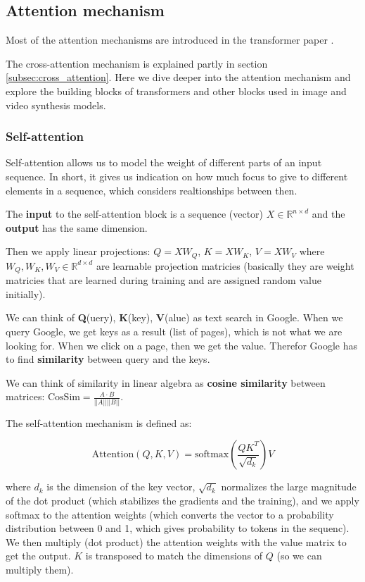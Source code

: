 \subsection{Attention mechanism}
\label{appendix:attention}

Most of the attention mechanisms are introduced in the transformer paper \cite{transformer}.

The cross-attention mechanism is explained partly in section \ref{subsec:cross_attention}. Here we dive deeper into the attention mechanism and explore the building blocks of transformers and other blocks used in image and video synthesis models.


\subsubsection{Self-attention}

Self-attention allows us to model the weight of different parts of an input sequence. In short, it gives us indication on how much focus to give to different elements in a sequence, which considers realtionships between then.

The \textbf{input} to the self-attention block is a sequence (vector) $X \in \mathbb{R}^{n \times d}$ and the \textbf{output} has the same dimension.

Then we apply linear projections: $Q = XW_Q$, $K = XW_K$, $V = XW_V$ where $W_Q, W_K, W_V \in \mathbb{R}^{d \times d}$ are learnable projection matricies (basically they are weight matricies that are learned during training and are assigned random value initially).

We can think of \textbf{Q}(uery), \textbf{K}(key), \textbf{V}(alue) as text search in Google. When we query Google, we get keys as a result (list of pages), which is not what we are looking for. When we click on a page, then we get the value. Therefor Google has to find \textbf{similarity} between query and the keys.

We can think of similarity in linear algebra as \textbf{cosine similarity} between matrices: $\text{CosSim} = \frac{A \cdot B}{||A|| ||B||}$.

The self-attention mechanism is defined as:

\begin{equation*}
    \text{Attention}(Q, K, V) = \text{softmax}\left( \frac{QK^T}{\sqrt{d_k}} \right) V
\end{equation*}

where $d_k$ is the dimension of the key vector, $\sqrt{d_k}$ normalizes the large magnitude of the dot product (which stabilizes the gradients and the training), and we apply softmax to the attention weights (which converts the vector to a probability distribution between 0 and 1, which gives probability to tokens in the sequenc). We then multiply (dot product) the attention weights with the value matrix to get the output. $K$ is transposed to match the dimensions of $Q$ (so we can multiply them).

